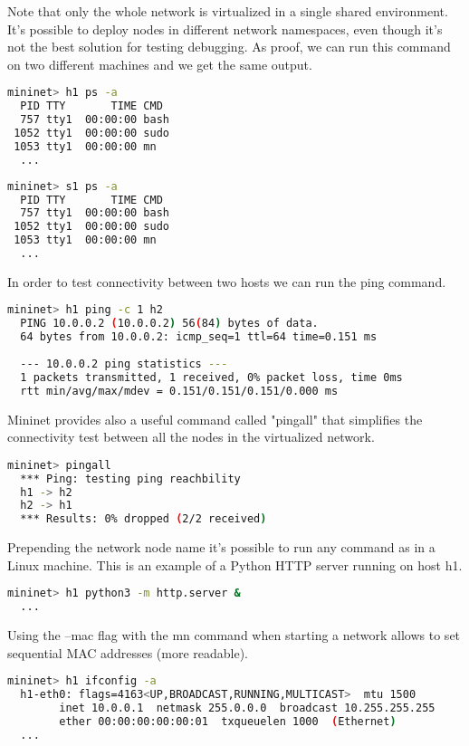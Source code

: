 \documentclass[a4paper,10pt]{memoir}
\begin{document}
Note that only the whole network is virtualized in a single shared environment. It's possible to deploy nodes in different network namespaces, even though it's not the best solution for testing debugging. As proof, we can run this command on two different machines and we get the same output.
\begin{lstlisting}[language=bash]
  mininet> h1 ps -a
  PID TTY       TIME CMD
  757 tty1  00:00:00 bash
 1052 tty1  00:00:00 sudo
 1053 tty1  00:00:00 mn
  ...
\end{lstlisting}
\begin{lstlisting}[language=bash]
  mininet> s1 ps -a
  PID TTY       TIME CMD
  757 tty1  00:00:00 bash
 1052 tty1  00:00:00 sudo
 1053 tty1  00:00:00 mn
  ...
\end{lstlisting}

In order to test connectivity between two hosts we can run the ping command.
\begin{lstlisting}[language=bash]
  mininet> h1 ping -c 1 h2
  PING 10.0.0.2 (10.0.0.2) 56(84) bytes of data.
  64 bytes from 10.0.0.2: icmp_seq=1 ttl=64 time=0.151 ms
  
  --- 10.0.0.2 ping statistics ---
  1 packets transmitted, 1 received, 0% packet loss, time 0ms
  rtt min/avg/max/mdev = 0.151/0.151/0.151/0.000 ms
\end{lstlisting}

Mininet provides also a useful command called "pingall" that simplifies the connectivity test between all the nodes in the virtualized network.
\begin{lstlisting}[language=bash]
  mininet> pingall
  *** Ping: testing ping reachbility
  h1 -> h2
  h2 -> h1
  *** Results: 0% dropped (2/2 received)
\end{lstlisting}

Prepending the network node name it's possible to run any command as in a Linux machine. This is an example of a Python HTTP server running on host h1.
\begin{lstlisting}[language=bash]
  mininet> h1 python3 -m http.server &
  ...
\end{lstlisting}

Using the --mac flag with the mn command when starting a network allows to set sequential MAC addresses (more readable).
\begin{lstlisting}[language=bash]
  mininet> h1 ifconfig -a
  h1-eth0: flags=4163<UP,BROADCAST,RUNNING,MULTICAST>  mtu 1500
        inet 10.0.0.1  netmask 255.0.0.0  broadcast 10.255.255.255
        ether 00:00:00:00:00:01  txqueuelen 1000  (Ethernet)
  ...
\end{lstlisting}
\end{document}
